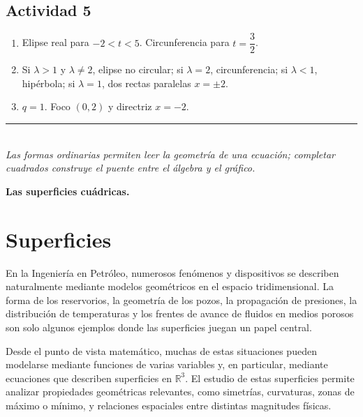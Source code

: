 \documentclass[11pt]{article}
\def\identacion{-2.5mm}%
\begin{document}
\subsection*{Actividad 5}

\begin{enumerate}[\hspace*{\identacion}1)]
\item Elipse real para $-2<t<5$. Circunferencia para $t=\dfrac32$.
\item Si $\lambda>1$ y $\lambda\neq2$, elipse no circular; si $\lambda=2$, circunferencia; si $\lambda<1$, hipérbola; si $\lambda=1$, dos rectas paralelas $x=\pm2$.
\item $q=1$. Foco $(0,2)$ y directriz $x=-2$.
\end{enumerate}

\bigskip
\begin{center}
\rule{.72\textwidth}{.4pt}\\[2mm]
\textit{Las formas ordinarias permiten leer la geometría de una ecuación; completar cuadrados construye el puente entre el álgebra y el gráfico.}
\end{center}














\newpage

\vspace*{-12mm}
\begin{center}
{\bf \Large{ Las superficies cuádricas. }}
\end{center}


\section*{Superficies}

En la Ingeniería en Petróleo, numerosos fenómenos y dispositivos se describen naturalmente mediante modelos geométricos en el espacio tridimensional. La forma de los reservorios, la geometría de los pozos, la propagación de presiones, la distribución de temperaturas y los frentes de avance de fluidos en medios porosos son solo algunos ejemplos donde las superficies juegan un papel central.

Desde el punto de vista matemático, muchas de estas situaciones pueden modelarse mediante funciones de varias variables y, en particular, mediante ecuaciones que describen superficies en $\mathbb{R}^3$. El estudio de estas superficies permite analizar propiedades geométricas relevantes, como simetrías, curvaturas, zonas de máximo o mínimo, y relaciones espaciales entre distintas magnitudes físicas.
\end{document}
